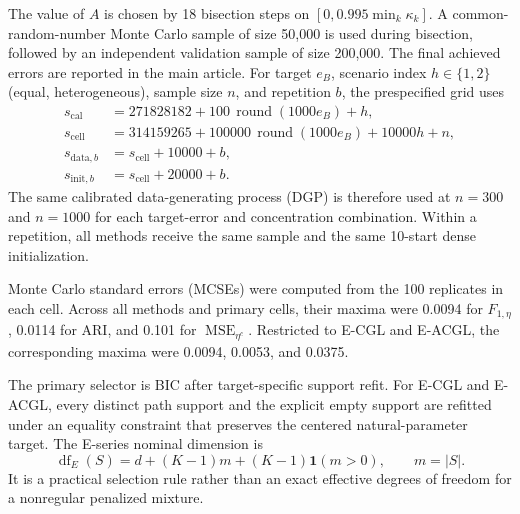 \documentclass[preprint,12pt,authoryear]{elsarticle}
\begin{document}
The value of $A$ is chosen by 18 bisection steps on
$[0,0.995\min_k\kappa_k]$. A common-random-number Monte Carlo sample of size
50,000 is used during bisection, followed by an independent validation sample
of size 200,000. The final achieved errors are reported in the main article.
For target $e_B$, scenario index $h\in\{1,2\}$ (equal, heterogeneous), sample
size $n$, and repetition $b$, the prespecified grid uses
\[
\begin{aligned}
s_{\mathrm{cal}}&=271828182+100\,\operatorname{round}(1000e_B)+h,\\
s_{\mathrm{cell}}&=314159265+100000\,\operatorname{round}(1000e_B)+10000h+n,\\
s_{\mathrm{data},b}&=s_{\mathrm{cell}}+10000+b,\\
s_{\mathrm{init},b}&=s_{\mathrm{cell}}+20000+b.
\end{aligned}
\]
The same calibrated data-generating process (DGP) is therefore used at $n=300$
and $n=1000$ for each
target-error and concentration combination. Within a repetition, all methods
receive the same sample and the same 10-start dense initialization.

Monte Carlo standard errors (MCSEs) were computed from the 100 replicates in each
cell. Across all methods and primary cells,
their maxima were 0.0094 for $F_{1,\eta}$, 0.0114 for ARI, and 0.101 for
$\operatorname{MSE}_{\eta^c}$. Restricted to E-CGL and E-ACGL, the
corresponding maxima were 0.0094,
0.0053, and 0.0375.

The primary selector is BIC after target-specific support refit. For E-CGL and
E-ACGL, every distinct path support and the explicit empty support are refitted
under an equality constraint that preserves the centered natural-parameter
target. The E-series nominal dimension is
\begin{equation}
\label{eq:supp-df-e}
\operatorname{df}_{E}(S)
=d+(K-1)m+(K-1)\mathbf 1(m>0),
\qquad m=|S|.
\end{equation}
It is a practical selection rule rather than an exact effective degrees of
freedom for a nonregular penalized mixture.
\end{document}
